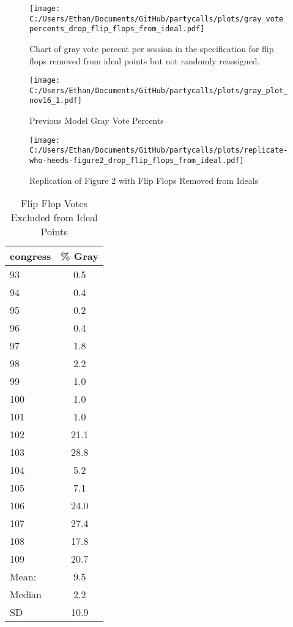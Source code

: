 \documentclass[12pt]{article}
\begin{document}
$ $


\begin{figure}[h]
	\caption{Chart of gray vote percent per session in the specification for flip flops removed from ideal points but not randomly reassigned.}
	\centering
	\texttt{[image: C:/Users/Ethan/Documents/GitHub/partycalls/plots/gray\_vote\_percents\_drop\_flip\_flops\_from\_ideal.pdf]}
	
\end{figure}



\begin{figure}[h]
	
	\caption{Previous Model Gray Vote Percents}
	\centering
	\texttt{[image: C:/Users/Ethan/Documents/GitHub/partycalls/plots/gray\_plot\_nov16\_1.pdf]}
	
\end{figure}

\begin{figure}[h]

\caption{Replication of Figure 2 with Flip Flops Removed from Ideals}
\centering
\texttt{[image: C:/Users/Ethan/Documents/GitHub/partycalls/plots/replicate-who-heeds-figure2\_drop\_flip\_flops\_from\_ideal.pdf]}

\end{figure}

	\begin{table}[!htbp]
		\centering
		\caption{Flip Flop Votes Excluded from Ideal Points}
		\begin{tabular}{l c}
			\hline
			congress & \% Gray \\ 
			\hline
			93 & 0.5 \\ 
			94 & 0.4 \\ 
			95 & 0.2 \\ 
			96 & 0.4 \\ 
			97 & 1.8 \\ 
			98 & 2.2 \\ 
			99 & 1.0 \\ 
			100 & 1.0 \\ 
			101 & 1.0 \\ 
			102 & 21.1 \\ 
			103 & 28.8 \\ 
			104 & 5.2 \\ 
			105 & 7.1 \\ 
			106 & 24.0 \\ 
			107 & 27.4 \\ 
			108 & 17.8 \\ 
			109 & 20.7 \\ 
			\hline
			Mean: & 9.5 \\
			Median & 2.2 \\
			SD & 10.9 \\
			\hline
		\end{tabular}
	\end{table}
	
\end{document}

